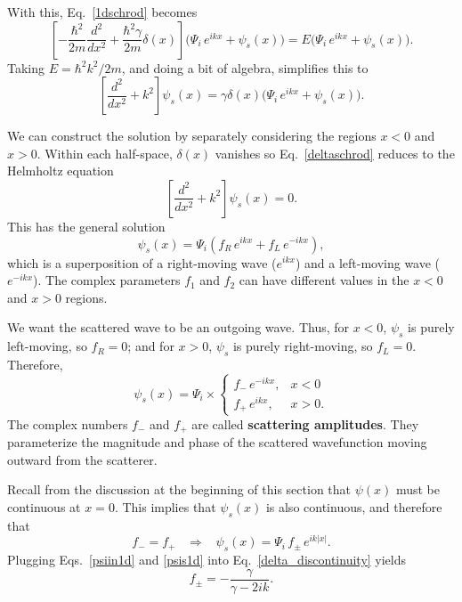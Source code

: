 \documentclass[prx,12pt]{revtex4-2}
\begin{document}
With this, Eq.~\eqref{1dschrod} becomes
\begin{equation}
  \left[-\frac{\hbar^2}{2m} \frac{d^2}{dx^2} + \frac{\hbar^2\gamma}{2m}\delta(x)\right] \Big(\Psi_i \, e^{ikx} + \psi_s(x) \Big)
  = E \Big(\Psi_i \, e^{ikx} + \psi_s(x) \Big).
\end{equation}
Taking $E = \hbar^2k^2/2m$, and doing a bit of algebra, simplifies this to
\begin{equation}
  \left[ \frac{d^2}{dx^2} + k^2\right] \psi_s(x)
  = \gamma \delta(x) \Big(\Psi_i \, e^{ikx} + \psi_s(x) \Big).
  \label{deltaschrod}
\end{equation}

We can construct the solution by separately considering the regions $x
< 0$ and $x > 0$.  Within each half-space, $\delta(x)$ vanishes so
Eq.~\eqref{deltaschrod} reduces to the Helmholtz equation
\begin{equation}
  \left[\frac{d^2}{dx^2} + k^2\right] \psi_s(x) = 0.
\end{equation}
This has the general solution
\begin{equation}
  \psi_s(x) = \Psi_i \left(f_R \, e^{ik x} + f_L \, e^{-ik x}\right),
\end{equation}
which is a superposition of a right-moving wave ($e^{ikx}$) and a left-moving
wave ($e^{-ikx}$).  The complex parameters $f_1$ and $f_2$ can
have different values in the $x < 0$ and $x > 0$ regions.

We want the scattered wave to be an outgoing wave.  Thus, for $x < 0$,
$\psi_s$ is purely left-moving, so $f_R = 0$; and for $x > 0$,
$\psi_s$ is purely right-moving, so $f_L = 0$.  Therefore,
\begin{equation}
  \psi_s(x) = \Psi_i \times \begin{cases}f_- \,e^{-ikx}, & x < 0 \\ f_+ \,e^{ikx}, & x > 0.\end{cases}
\end{equation}
The complex numbers $f_-$ and $f_+$ are called \textbf{scattering
  amplitudes}.  They parameterize the magnitude and phase of the
scattered wavefunction moving outward from the scatterer.

Recall from the discussion at the beginning of this section that
$\psi(x)$ must be continuous at $x = 0$.  This implies that
$\psi_s(x)$ is also continuous, and therefore that
\begin{equation}
  f_- = f_+ \;\;\;\Rightarrow \;\;\;
  \psi_s(x) = \Psi_i \,f_\pm\, e^{ik|x|}.
  \label{psis1d}
\end{equation}
Plugging Eqs.~\eqref{psiin1d} and \eqref{psis1d} into
Eq.~\eqref{delta_discontinuity} yields
\begin{equation}
  f_\pm = -\frac{\gamma}{\gamma - 2ik}.
\end{equation}
\end{document}
